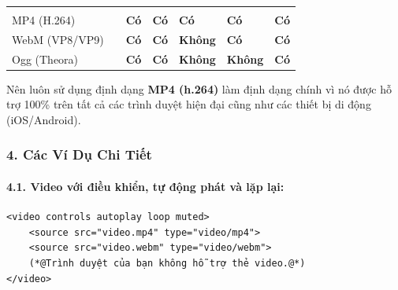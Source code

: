 \begin{prettyTableBox}
\begin{tabularx}{\linewidth}{Z Z Y Y Y Y Y}
 &  &  &  &  &  &  \\
MP4 (H.264) &  & \textcolor{green!50!black}{\textbf{Có}} & \textcolor{green!50!black}{\textbf{Có}} & \textcolor{green!50!black}{\textbf{Có}} & \textcolor{green!50!black}{\textbf{Có}} & \textcolor{green!50!black}{\textbf{Có}} \\
WebM (VP8/VP9) &  & \textcolor{green!50!black}{\textbf{Có}} & \textcolor{green!50!black}{\textbf{Có}} & \textcolor{red!70!black}{\textbf{Không}} & \textcolor{green!50!black}{\textbf{Có}} & \textcolor{green!50!black}{\textbf{Có}} \\
Ogg (Theora) &  & \textcolor{green!50!black}{\textbf{Có}} & \textcolor{green!50!black}{\textbf{Có}} & \textcolor{red!70!black}{\textbf{Không}} & \textcolor{red!70!black}{\textbf{Không}} & \textcolor{green!50!black}{\textbf{Có}} \\
\end{tabularx}
\end{prettyTableBox}

\begin{tipBox}
Nên luôn sử dụng định dạng \textbf{MP4 (h.264)} làm định dạng chính vì nó được hỗ trợ 100\% trên tất cả các trình duyệt hiện đại cũng như các thiết bị di động (iOS/Android).
\end{tipBox}

\subsubsection{4. Các Ví Dụ Chi Tiết}

\paragraph{4.1. Video với điều khiển, tự động phát và lặp lại:}

\begin{codeWindow}
\begin{lstlisting}[language=HTML5]
<video controls autoplay loop muted>
    <source src="video.mp4" type="video/mp4">
    <source src="video.webm" type="video/webm">
    (*@Trình duyệt của bạn không hỗ trợ thẻ video.@*)
</video>
\end{lstlisting}
\end{codeWindow}

